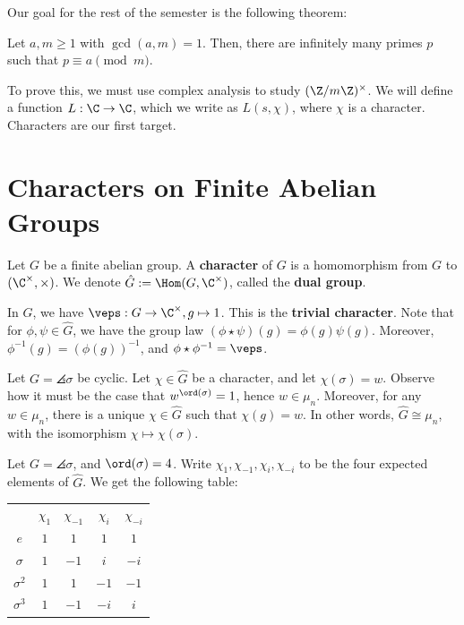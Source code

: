 
Our goal for the rest of the semester is the following theorem:

\begin{thm*}
Let $a,m \ge 1$ with $\gcd (a,m)=1$. Then, there are infinitely many primes $p$ such that $p \equiv a \pmod m$.
\end{thm*}

To prove this, we must use complex analysis to study $(\Z/m\Z)^\times$. We will define a function $L : \C \to \C$, which we write as $L(s, \chi)$, where $\chi$ is a character. Characters are our first target.

\section{Characters on Finite Abelian Groups}

\begin{defn}
    Let $G$ be a finite abelian group. A \textbf{character} of $G$ is a homomorphism from $G$ to $(\C^\times, \times)$. We denote $\hat G :=\Hom (G, \C^\times)$, called the \textbf{dual group}.
\end{defn}

\begin{ex}
    In $\hat G$, we have $\veps : G \to \C^\times, g\mapsto 1$. This is the \textbf{trivial character}. Note that for $\phi,\psi \in \hat G$, we have the group law $(\phi \star \psi)(g)  = \phi(g)\psi(g)$. Moreover, $\phi ^{-1}(g)=(\phi(g))^{-1}$, and $\phi \star \phi^{-1}=\veps$.
\end{ex}

\begin{ex}
    Let $G = \angles{\sigma}$ be cyclic. Let $\chi \in \hat G$ be a character, and let $\chi ( \sigma)=w$. Observe how it must be the case that $w^{\ord (\sigma)}=1$, hence $w \in \mu _n$. Moreover, for any $w \in \mu _n$, there is a unique $\chi \in \hat G$ such that $\chi (g) =w$. In other words, $\hat G \cong \mu _n$, with the isomorphism $\chi \mapsto \chi (\sigma)$.
\end{ex}

\begin{ex}
    Let $G = \angles{\sigma}$, and $\ord (\sigma)=4$. Write $\chi_1,\chi_{-1},\chi_i,\chi_{-i}$ to be the four expected elements of $\hat G$. We get the following table:
    \begin{center}
    \begin{tabular}{ccccc}
         & $\chi_1$ & $\chi_{-1}$ & $\chi _i$ & $\chi _{-i}$ \\
       $e$  & $1$ & $1$ & $1$ & $1$ \\
       $\sigma$  & $1$ & $-1$ & $i$ & $-i$ \\
       $\sigma^2$  & $1$ & $1$ & $-1$ & $-1$\\
        $\sigma^3$ & $1$ & $-1$ & $-i$ & $i$ \\
    \end{tabular}
    \end{center}
\end{ex}

